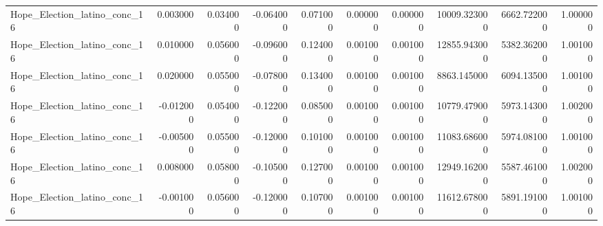 \begin{table}
\begin{tabular}{lrrrrrrrrr}
Hope_Election_latino_conc_16 & 0.003000 & 0.034000 & -0.064000 & 0.071000 & 0.000000 & 0.000000 & 10009.323000 & 6662.722000 & 1.000000 \\
Hope_Election_latino_conc_16 & 0.010000 & 0.056000 & -0.096000 & 0.124000 & 0.001000 & 0.001000 & 12855.943000 & 5382.362000 & 1.001000 \\
Hope_Election_latino_conc_16 & 0.020000 & 0.055000 & -0.078000 & 0.134000 & 0.001000 & 0.001000 & 8863.145000 & 6094.135000 & 1.001000 \\
Hope_Election_latino_conc_16 & -0.012000 & 0.054000 & -0.122000 & 0.085000 & 0.001000 & 0.001000 & 10779.479000 & 5973.143000 & 1.002000 \\
Hope_Election_latino_conc_16 & -0.005000 & 0.055000 & -0.120000 & 0.101000 & 0.001000 & 0.001000 & 11083.686000 & 5974.081000 & 1.001000 \\
Hope_Election_latino_conc_16 & 0.008000 & 0.058000 & -0.105000 & 0.127000 & 0.001000 & 0.001000 & 12949.162000 & 5587.461000 & 1.002000 \\
Hope_Election_latino_conc_16 & -0.001000 & 0.056000 & -0.120000 & 0.107000 & 0.001000 & 0.001000 & 11612.678000 & 5891.191000 & 1.001000 \\
\bottomrule
\end{tabular}
\end{table}
